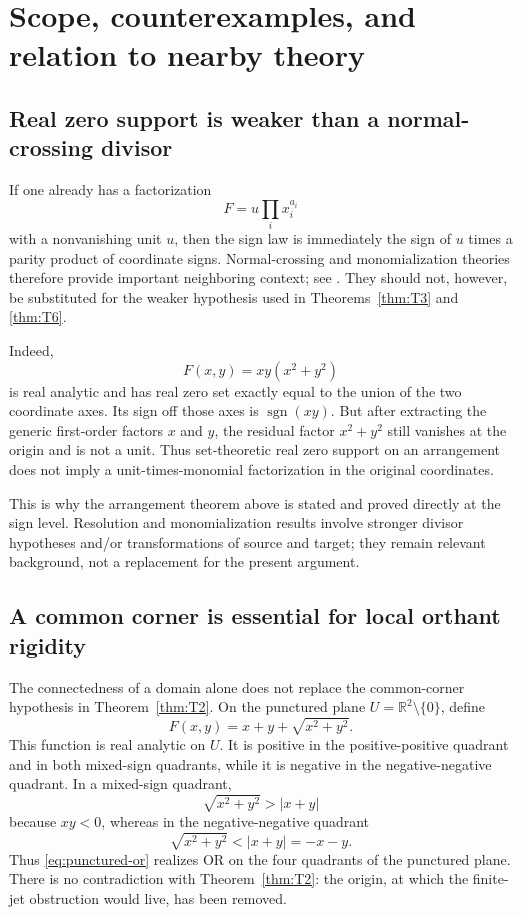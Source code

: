 \documentclass[11pt]{article}
\theoremstyle{definition}
\theoremstyle{remark}
\newcommand{\R}{\mathbb{R}}
\newcommand{\sign}{\operatorname{sgn}}
\begin{document}
\section{Scope, counterexamples, and relation to nearby theory}\label{sec:scope}

\subsection{Real zero support is weaker than a normal-crossing divisor}

If one already has a factorization
\[
 F=u\prod_i x_i^{a_i}
\]
with a nonvanishing unit $u$, then the sign law is immediately the sign of $u$ times a parity product of coordinate signs. Normal-crossing and monomialization theories therefore provide important neighboring context; see \cite{BierstoneMilman2004,BelottoBierstone2023}. They should not, however, be substituted for the weaker hypothesis used in Theorems~\ref{thm:T3} and \ref{thm:T6}.

Indeed,
\begin{equation}\label{eq:weak-support-example}
 F(x,y)=xy(x^2+y^2)
\end{equation}
is real analytic and has real zero set exactly equal to the union of the two coordinate axes. Its sign off those axes is $\sign(xy)$. But after extracting the generic first-order factors $x$ and $y$, the residual factor $x^2+y^2$ still vanishes at the origin and is not a unit. Thus set-theoretic real zero support on an arrangement does not imply a unit-times-monomial factorization in the original coordinates.

This is why the arrangement theorem above is stated and proved directly at the sign level. Resolution and monomialization results involve stronger divisor hypotheses and/or transformations of source and target; they remain relevant background, not a replacement for the present argument.

\subsection{A common corner is essential for local orthant rigidity}

The connectedness of a domain alone does not replace the common-corner hypothesis in Theorem~\ref{thm:T2}. On the punctured plane $U=\R^2\setminus\{0\}$, define
\begin{equation}\label{eq:punctured-or}
 F(x,y)=x+y+\sqrt{x^2+y^2}.
\end{equation}
This function is real analytic on $U$. It is positive in the positive-positive quadrant and in both mixed-sign quadrants, while it is negative in the negative-negative quadrant. In a mixed-sign quadrant,
\[
 \sqrt{x^2+y^2}>|x+y|
\]
because $xy<0$, whereas in the negative-negative quadrant
\[
 \sqrt{x^2+y^2}<|x+y|=-x-y.
\]
Thus \eqref{eq:punctured-or} realizes OR on the four quadrants of the punctured plane. There is no contradiction with Theorem~\ref{thm:T2}: the origin, at which the finite-jet obstruction would live, has been removed.
\end{document}
